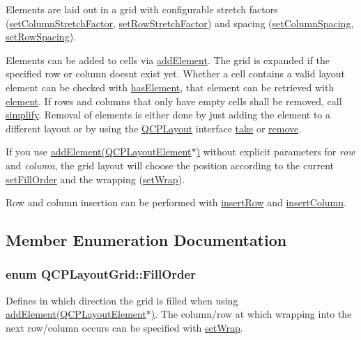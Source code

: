 Elements are laid out in a grid with configurable stretch factors (\hyperlink{classQCPLayoutGrid_ae38f31a71687b9d7ee3104852528fb50}{set\+Column\+Stretch\+Factor}, \hyperlink{classQCPLayoutGrid_a7b0273de5369bd93d942edbaf5b166ec}{set\+Row\+Stretch\+Factor}) and spacing (\hyperlink{classQCPLayoutGrid_a3a49272aba32bb0fddc3bb2a45a3dba0}{set\+Column\+Spacing}, \hyperlink{classQCPLayoutGrid_aaef2cd2d456197ee06a208793678e436}{set\+Row\+Spacing}).

Elements can be added to cells via \hyperlink{classQCPLayoutGrid_adff1a2ca691ed83d2d24a4cd1fe17012}{add\+Element}. The grid is expanded if the specified row or column doesn\textquotesingle{}t exist yet. Whether a cell contains a valid layout element can be checked with \hyperlink{classQCPLayoutGrid_ab0cf4f7edc9414a3bfaddac0f46dc0a0}{has\+Element}, that element can be retrieved with \hyperlink{classQCPLayoutGrid_a525f25e6ba43ee228151d074251b4e6a}{element}. If rows and columns that only have empty cells shall be removed, call \hyperlink{classQCPLayoutGrid_a38621ca7aa633b6a9a88617df7f08672}{simplify}. Removal of elements is either done by just adding the element to a different layout or by using the \hyperlink{classQCPLayout}{Q\+C\+P\+Layout} interface \hyperlink{classQCPLayoutGrid_aee961c2eb6cf8a85dcbc5a7d7b6c1a00}{take} or \hyperlink{classQCPLayout_a6c58f537d8086f352576ab7c5b15d0bc}{remove}.

If you use \hyperlink{classQCPLayoutGrid_a4c44025dd25acd27e053cadfd448ad7b}{add\+Element(\+Q\+C\+P\+Layout\+Element$\ast$)} without explicit parameters for {\itshape row} and {\itshape column}, the grid layout will choose the position according to the current \hyperlink{classQCPLayoutGrid_affc2f3cfd22f28698c5b29b960d2a391}{set\+Fill\+Order} and the wrapping (\hyperlink{classQCPLayoutGrid_ab36af18d77e4428386d02970382ee598}{set\+Wrap}).

Row and column insertion can be performed with \hyperlink{classQCPLayoutGrid_a48af3dd7c3a653d9c3d7dd99bd02e838}{insert\+Row} and \hyperlink{classQCPLayoutGrid_a1e880a321dbe8b43b471ccd764433dc4}{insert\+Column}. 

\subsection{Member Enumeration Documentation}
\subsubsection[{\texorpdfstring{Fill\+Order}{FillOrder}}]{\setlength{\rightskip}{0pt plus 5cm}enum {\bf Q\+C\+P\+Layout\+Grid\+::\+Fill\+Order}}\hypertarget{classQCPLayoutGrid_a7d49ee08773de6b2fd246edfed353cca}{}\label{classQCPLayoutGrid_a7d49ee08773de6b2fd246edfed353cca}
Defines in which direction the grid is filled when using \hyperlink{classQCPLayoutGrid_a4c44025dd25acd27e053cadfd448ad7b}{add\+Element(\+Q\+C\+P\+Layout\+Element$\ast$)}. The column/row at which wrapping into the next row/column occurs can be specified with \hyperlink{classQCPLayoutGrid_ab36af18d77e4428386d02970382ee598}{set\+Wrap}.

